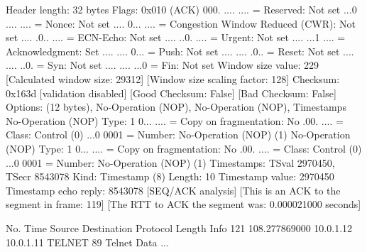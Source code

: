     Header length: 32 bytes
    Flags: 0x010 (ACK)
        000. .... .... = Reserved: Not set
        ...0 .... .... = Nonce: Not set
        .... 0... .... = Congestion Window Reduced (CWR): Not set
        .... .0.. .... = ECN-Echo: Not set
        .... ..0. .... = Urgent: Not set
        .... ...1 .... = Acknowledgment: Set
        .... .... 0... = Push: Not set
        .... .... .0.. = Reset: Not set
        .... .... ..0. = Syn: Not set
        .... .... ...0 = Fin: Not set
    Window size value: 229
    [Calculated window size: 29312]
    [Window size scaling factor: 128]
    Checksum: 0x163d [validation disabled]
        [Good Checksum: False]
        [Bad Checksum: False]
    Options: (12 bytes), No-Operation (NOP), No-Operation (NOP), Timestamps
        No-Operation (NOP)
            Type: 1
                0... .... = Copy on fragmentation: No
                .00. .... = Class: Control (0)
                ...0 0001 = Number: No-Operation (NOP) (1)
        No-Operation (NOP)
            Type: 1
                0... .... = Copy on fragmentation: No
                .00. .... = Class: Control (0)
                ...0 0001 = Number: No-Operation (NOP) (1)
        Timestamps: TSval 2970450, TSecr 8543078
            Kind: Timestamp (8)
            Length: 10
            Timestamp value: 2970450
            Timestamp echo reply: 8543078
    [SEQ/ACK analysis]
        [This is an ACK to the segment in frame: 119]
        [The RTT to ACK the segment was: 0.000021000 seconds]

No.     Time           Source                Destination           Protocol Length Info
    121 108.277869000  10.0.1.12             10.0.1.11             TELNET   89     Telnet Data ...

